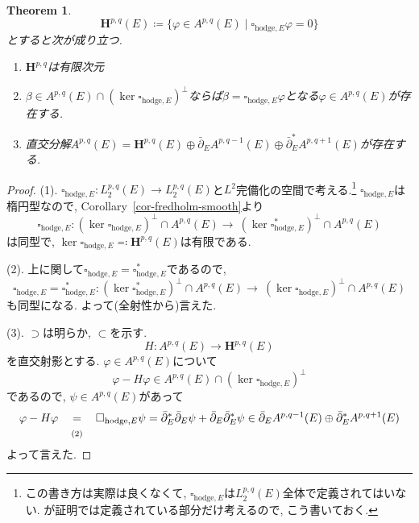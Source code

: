 \documentclass[dvipdfmx,a4paper,11pt]{article} %
\newtheorem{thm}{Theorem}[section]
\theoremstyle{definition}
\theoremstyle{remark}
\numberwithin{equation}{section}
\newcommand{\underalign}[2]{%
  \quad
  \underset{\mathclap{\raisebox{-1.6ex}{\ensuremath{\scriptstyle #1}}}}{#2}
  \quad
}
\begin{document}
\begin{thm}
\label{thm-harmonic-integral}
\[
\mathbf{H}^{p,q}(E)\coloneqq \{ \varphi \in A^{p,q}(E) \mid \square_{\mathrm{hodge}, E} \varphi =0\}
\]
とすると次が成り立つ. 
\begin{enumerate}
\item $\mathbf{H}^{p,q}$は有限次元
\item $\beta \in A^{p,q}(E) \cap (\ker \square_{\mathrm{hodge}, E})^\perp$ならば$\beta =\square_{\mathrm{hodge}, E} \varphi$となる$\varphi \in A^{p,q}(E)$が存在する.
\item 直交分解$A^{p,q}(E) = \mathbf{H}^{p,q}(E)\oplus \bar\partial_EA^{p,q-1}(E) \oplus \bar\partial_E^{*}A^{p,q+1}(E)$が存在する. 
\end{enumerate}
\end{thm}
\begin{proof}
(1). 
$\square_{\mathrm{hodge}, E}  \colon L^{p,q}_{2}(E) \to L^{p,q}_{2}(E)$と$L^2$完備化の空間で考える.\footnote{この書き方は実際は良くなくて, $\square_{\mathrm{hodge}, E}$は$ L^{p,q}_{2}(E)$全体で定義されてはいない. が証明では定義されている部分だけ考えるので, こう書いておく. }
$\square_{\mathrm{hodge}, E} $は楕円型なので, 
Corollary~\ref{cor-fredholm-smooth}より
\[
\square_{\mathrm{hodge}, E} \colon (\ker \square_{\mathrm{hodge}, E} )^\perp\cap A^{p,q}(E)  \to\ (\ker \square_{\mathrm{hodge}, E}^{*})^\perp\cap A^{p,q}(E)
\]
は同型で, $\ker \square_{\mathrm{hodge}, E} \eqqcolon \mathbf{H}^{p,q}(E)$は有限である. 

(2). 上に関して$\square_{\mathrm{hodge}, E} =\square_{\mathrm{hodge}, E}^{*}$であるので, 
\[
\square_{\mathrm{hodge}, E}=\square_{\mathrm{hodge}, E}^{*}
 \colon (\ker \square_{\mathrm{hodge}, E}^{*} )^\perp\cap A^{p,q}(E)  \to\ (\ker \square_{\mathrm{hodge}, E})^\perp\cap A^{p,q}(E)
\]
も同型になる. よって(全射性から)言えた. 

(3). $\supset$は明らか, $\subset$を示す. 
\[
H \colon A^{p,q}(E) \to \mathbf{H}^{p,q}(E)
\]
を直交射影とする. $\varphi \in  A^{p,q}(E)$について
\[
\varphi - H \varphi \in A^{p,q}(E) \cap (\ker \square_{\mathrm{hodge}, E})^\perp
\]
であるので, $\psi \in A^{p,q}(E) $があって
\[
\varphi - H\varphi  
\underalign{\text{(2)}}{=}
\square_{\mathrm{hodge}, E} \psi  
= \bar\partial_E^{*} \bar\partial_E \psi +\bar\partial_E \bar\partial_E^{*} \psi
\in \bar\partial_EA^{p,q-1}(E) \oplus \bar\partial_E^{*}A^{p,q+1}(E)
\]
よって言えた. 
\end{proof}
\end{document}

